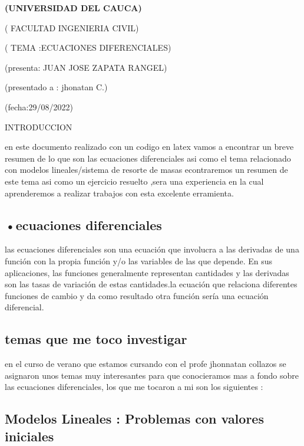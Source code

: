 \documentclass[12pt]{book}
\begin{document}
\begin{titlepage}
\centering
\bfseries\LARGE(UNIVERSIDAD DEL CAUCA)

\vspace{1cm}
\scshape( FACULTAD INGENIERIA CIVIL)

\vspace{2cm}
\scshape( TEMA :ECUACIONES DIFERENCIALES)

\vspace{2cm}
\large(presenta: JUAN JOSE ZAPATA RANGEL)

\vspace{2 cm} 
\large(presentado a : jhonatan C.)

\vspace{0.5cm}
\large(fecha:29/08/2022)

\end{titlepage}
\begin{center}
INTRODUCCION 

en este documento realizado con un codigo en latex vamos a encontrar un breve resumen de lo que son las ecuaciones diferenciales asi como el tema relacionado con modelos lineales/sistema de resorte de masas econtraremos un resumen de este tema asi como un ejercicio resuelto ,sera una experiencia en la cual aprenderemos a realizar trabajos con esta excelente erramienta.
\end{center}
\begin{center}
\chapter{•ecuaciones diferenciales}
\end{center}
las ecuaciones diferenciales son una ecuación que involucra a las derivadas de una función con la propia función y/o las variables de las que depende. En sus aplicaciones, las funciones generalmente representan cantidades y las derivadas son las tasas de variación de estas cantidades.la ecuación que relaciona diferentes funciones de cambio y da como resultado otra función sería una ecuación diferencial.
\section{temas que me toco investigar}
en el curso de verano que estamos cursando con el profe jhonnatan collazos se asignaron unos temas muy interesantes para que conocieramos mas a fondo sobre las ecuaciones diferenciales, los que me tocaron a mi son los siguientes :
\section{Modelos Lineales : Problemas con valores iniciales }
\end{document}
